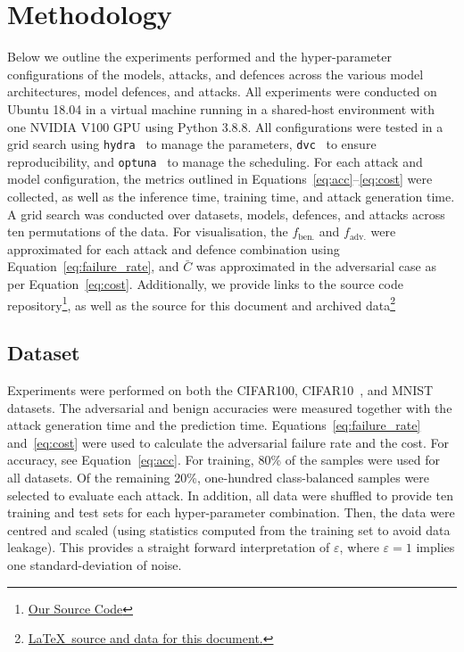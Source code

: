\section{Methodology}
\label{methods}
Below we outline the experiments performed and the hyper-parameter configurations of the models, attacks, and defences across the various model architectures, model defences, and attacks. 
All experiments were conducted on Ubuntu 18.04 in a virtual machine running in a shared-host environment with one NVIDIA V100 GPU using Python 3.8.8. 
All configurations were tested in a grid search using \texttt{hydra}~\cite{hydra} to manage the parameters, \texttt{dvc}~\cite{dvc} to ensure reproducibility, and \texttt{optuna}~\cite{optuna} to manage the scheduling. 
For each attack and model configuration, the metrics outlined in Equations~\ref{eq:acc}--\ref{eq:cost} were collected, as well as the inference time, training time, and attack generation time. 
A grid search was conducted over datasets, models, defences, and attacks across ten permutations of the data. For visualisation, the $f_{\mathrm{ben.}}$ and $f_{\mathrm{adv.}}$ were approximated for each attack and defence combination using Equation~\ref{eq:failure_rate}, and $\bar{C}$ was approximated in the adversarial case as per Equation~\ref{eq:cost}. 
Additionally, we provide links to the source code repository\footnote{\href{https://github.com/simplymathematics/deckard/tree/main/examples/pytorch}{Our Source Code}}, as well as the source for this document and archived data\footnote{\href{https://github.com/simplymathematics/ml_afr}{ \LaTeX~source and data for this document.}}



\subsection{Dataset}
\label{dataset}

Experiments were performed on both the CIFAR100, CIFAR10~\cite{cifar}, and MNIST~\cite{mnist} datasets. 
The adversarial and benign accuracies were measured together with the attack generation time and the prediction time. 
Equations~\ref{eq:failure_rate} and~\ref{eq:cost} were used to calculate the adversarial failure rate and the cost. For accuracy, see Equation~\ref{eq:acc}. 
For training, 80\% of the samples were used for all datasets. Of the remaining 20\%, one-hundred class-balanced samples were selected to evaluate each attack. 
In addition, all data were shuffled to provide ten training and test sets for each hyper-parameter combination. 
Then, the data were centred and scaled (using statistics computed from the training set to avoid data leakage). 
This provides a straight forward interpretation of $\varepsilon$, where $\varepsilon = 1$ implies one standard-deviation of noise.


